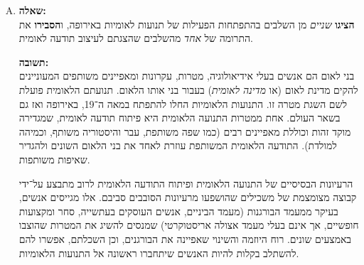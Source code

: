 \documentclass[a4paper]{article}
\newcommand\hl[1]   {#1}
\begin{document}
\begin{enumerate}[A.]
			אחרונה, נדבר על השינויים במצב הכלכלי והחברתי. התרחשה \hl{המהפכה האגררית} (התייעלות יצירת המזון, שאפשרה עבודה של יותר אנשים בערים ומפעלים שלא עוסקים באוכל באופן ישיר) והחל \hl{תהליך התיעוש} ו\hl{המעבר אל העיר}. התהליכים גררו ריכוז רב של אנשים במקומות מטונפים וקרים, ולרוב גם התרחקות מהבית וממוקדי הזהות. התהליכים הללו גרמו לשתי תוצאות חיוביות בעבור הלאומיות – ראשית, החיפוש אחר מוקד זהות חדש הוביל אנשים רבים לפנות אל התנועות הלאומיות. הריכוז של האנשים רבים על שטח קטן עזר לתפוצה של הרעיונות הלאומיים בצורה מהירה יותר, תפוצה שהתחזקה אף יותר בזכות \hl{מהפכת הדפוס} שאפשרה לאדם הממוצע לקרוא ולעסוק בנושאים כגון אלו. ההתפשטות המהירה של רעיונות הלאומיות הובילו לחיזוק התנועות הלאומיות. 
			
			נתבונן בקטע המקור ''הד המהפכה באמריקה`` (בספר ''הלאומיות בישראל ובעמים``, הוצאת כנרת 2014, עמוד 26) העוסק בהשפעת המהפכה האמריקאית על התנועות הלאומיות. לפי קטע המקור, ''גבורתם של הרפובליקאים החדשים באמריקה רכשה לא הוקרה ברחבי אירופה וזכתה לאהדתם של כל שוחרי הצד וההומאניות, ובפרט של האנשים הצעירים`` – עקרונות הליברליזם, הנאורות, והערעור על מוסדות המלוכה שעליהם התבססה המהפכה המריקאית, נפוצו בקרב כל אירופה, ובמיוחד בדור המהפכני והחדש שגדל בה. אף בצרפת שהייתה שנים תחת שלטון מלוכני, ''קשה לתאר את ההתלהבות, בה נתקבלו בצרפת, בתוך הממלכה העתיקה, נציגיו של עם אשר התקומם נגד מלכו`` – העם הצרפתי המשולהב ראה את ההצלחה נגד בריטניה, ורצה לממשה גם בארצו, מה שאכן התרחש כעשור לאחר מכן. 
			
			\item \textbf{שאלה: }\\
			\textbf{הציגו} \textit{שניים} מן השלבים בהתפתחות הפעילות של תנועות לאומיות באירופה, ו\textbf{הסבירו} את התרומה של \textit{אחד} מהשלבים שהצגתם לעיצוב תודעה לאומית. 
			
			\textbf{תשובה: } \\
			\hl{בני לאום} הם אנשים בעלי אידיאולוגיה, מטרות, עקרונות ומאפיינים משותפים המעוניינים להקים \hl{מדינת לאום} (או \textit{מדינה לאומית}) בעבור בני אותו הלאום. \hl{תנועתם הלאומית} פועלת לשם השגת מטרה זו. התנועות הלאומיות החלו להתפתח במאה ה־19, באירופה ואז גם בשאר העולם. אחת ממטרות התנועה הלאומית היא פיתוח \hl{תודעה לאומית}, שמגדירה מוקד זהות וכוללת מאפיינים רבים (כמו שפה משותפת, עבר והיסטוריה משותף, וכמיהה למולדת). התודעה הלאומית המשותפת עוזרת לאחד את בני הלאום השונים ולהגדיר שאיפות משותפות. 
			
			הרעיונות הבסיסיים של התנועה הלאומית ופיתוח התודעה הלאומית לרוב מתבצע על־ידי קבוצה מצומצמת של משכילים שהושפעו מרעיונות הסובבים סביבם. אלו מגייסים אנשים, בעיקר ממעמד הבורגנות (מעמד הביניים, אנשים העוסקים בעתשייה, סחר ומקצועות חופשיים, אך אינם בעלי מעמד אצולה אריסטוקרטי) שמנסים להשיג את המטרות שהוצבו באמצעים שונים. רוח היוזמה והשינוי שאפיינה את הבורגנים, וכן השכלתם, אפשרו להם להשתלב בקלות להיות האנשים שיתחברו ראשונה אל התנועות הלאומיות. 
			

\end{enumerate}
\end{document}
